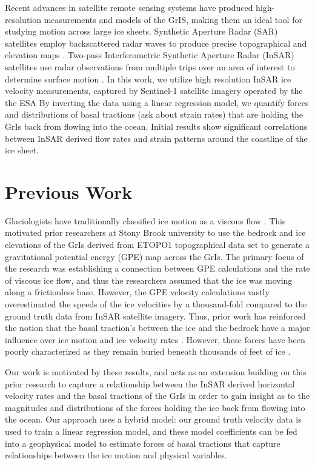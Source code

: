 \documentclass{article}
\begin{document}
Recent advances in satellite remote sensing systems have produced high-resolution measurements and models of the GrIS, making them an ideal tool for studying motion across large ice sheets. Synthetic Aperture Radar (SAR) satellites employ backscattered radar waves to produce precise topographical and elevation maps \cite{myer}. Two-pass Interferometric Synthetic Aperture Radar (InSAR) satellites use radar observations from multiple trips over an area of interest to determine surface motion \cite{wild_differential_2019}. In this work, we utilize high resolution InSAR ice velocity measurements, captured by Sentinel-1 satellite imagery operated by the the ESA By inverting the data using a linear regression model, we quantify forces and distributions of basal tractions (ask about strain rates) that are holding the GrIs back from flowing into the ocean. Initial results show significant correlations between InSAR derived flow rates and strain patterns around the coastline of the ice sheet.

\section{Previous Work}

Glaciologists have traditionally classified ice motion as a viscous flow \cite{morland_steady_1980}. This motivated prior researchers at Stony Brook university to use the bedrock and ice elevations of the GrIs derived from ETOPO1 topographical data set to generate a gravitational potential energy (GPE) map across the GrIs. The primary focus of the research was establishing a connection between GPE calculations and the rate of viscous ice flow, and thus the researchers assumed that the ice was moving along a frictionless base. However, the GPE velocity calculations vastly overestimated the speeds of the ice velocities by a thousand-fold compared to the ground truth data from InSAR satellite imagery. Thus, prior work has reinforced the notion that the basal traction's between the ice and the bedrock have a major influence over ice motion and ice velocity rates \cite{maier_basal_2021}. However, these forces have been poorly characterized as they remain buried beneath thousands of feet of ice \cite{maier_basal_2021}.

Our work is motivated by these results, and acts as an extension building on this prior research to capture a relationship between the InSAR derived horizontal velocity rates and the basal tractions of the GrIs in order to gain insight as to the magnitudes and distributions of the forces holding the ice back from flowing into the ocean. Our approach uses a hybrid model: our ground truth velocity data is used to train a linear regression model, and these model coefficients can be fed into a geophysical model to estimate forces of basal tractions that capture relationships between the ice motion and physical variables.
\end{document}
